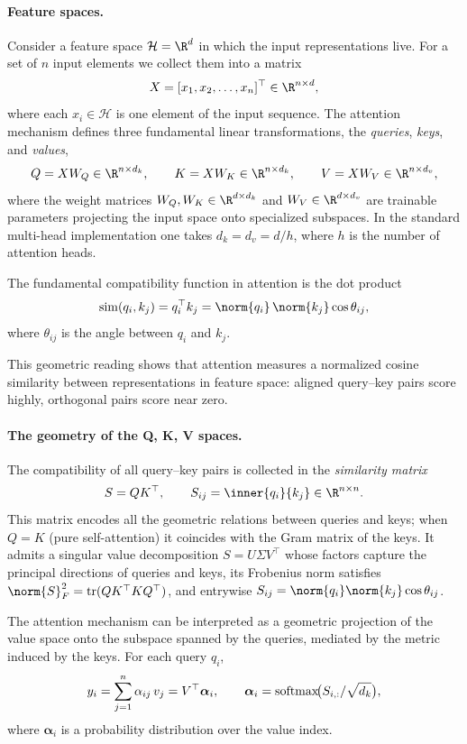 \paragraph{Feature spaces.}
Consider a feature space $\mathcal{H} = \R^d$ in which the input
representations live. For a set of $n$ input elements we collect them into a
matrix
\[
  X = [x_1, x_2, \dots, x_n]^\top \in \R^{n \times d},
\]
where each $x_i \in \mathcal{H}$ is one element of the input sequence. The
attention mechanism defines three fundamental linear transformations, the
\emph{queries}, \emph{keys}, and \emph{values},
\[
  Q = X W_Q \in \R^{n\times d_k},
  \qquad
  K = X W_K \in \R^{n\times d_k},
  \qquad
  V = X W_V \in \R^{n\times d_v},
\]
where the weight matrices $W_Q, W_K \in \R^{d\times d_k}$ and
$W_V \in \R^{d\times d_v}$ are trainable parameters projecting the input space
onto specialized subspaces. In the standard multi-head implementation one takes
$d_k = d_v = d/h$, where $h$ is the number of attention heads.

\begin{definition}
\label{def:apps:dot-similarity}
The fundamental compatibility function in attention is the dot product
\[
  \operatorname{sim}(q_i, k_j) = q_i^\top k_j
  = \norm{q_i}\,\norm{k_j}\cos\theta_{ij},
\]
where $\theta_{ij}$ is the angle between $q_i$ and $k_j$.
\end{definition}

This geometric reading shows that attention measures a normalized cosine
similarity between representations in feature space: aligned query--key pairs
score highly, orthogonal pairs score near zero.

\paragraph{The geometry of the Q, K, V spaces.}
The compatibility of all query--key pairs is collected in the
\emph{similarity matrix}
\[
  S = Q K^\top, \qquad S_{ij} = \inner{q_i}{k_j} \in \R^{n\times n}.
\]
This matrix encodes all the geometric relations between queries and keys; when
$Q = K$ (pure self-attention) it coincides with the Gram matrix of the keys. It
admits a singular value decomposition $S = U\Sigma V^\top$ whose factors capture
the principal directions of queries and keys, its Frobenius norm satisfies
$\norm{S}_F^2 = \operatorname{tr}(QK^\top K Q^\top)$, and entrywise
$S_{ij} = \norm{q_i}\norm{k_j}\cos\theta_{ij}$.

\begin{theorem}
\label{thm:apps:geom-projection}
The attention mechanism can be interpreted as a geometric projection of the
value space onto the subspace spanned by the queries, mediated by the metric
induced by the keys. For each query $q_i$,
\[
  y_i = \sum_{j=1}^{n} \alpha_{ij}\, v_j = V^\top \boldsymbol{\alpha}_i,
  \qquad
  \boldsymbol{\alpha}_i = \operatorname{softmax}\!\bigl(S_{i,:}/\sqrt{d_k}\bigr),
\]
where $\boldsymbol{\alpha}_i$ is a probability distribution over the value
index.
\end{theorem}

